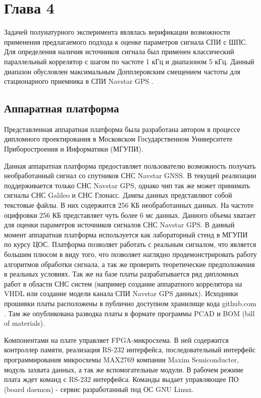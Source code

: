\section{Глава 4}
\label{ss:hw}

Задачей полунатурного эксперимента являлась верификации возможности применения предлагаемого подхода к оценке параметров сигнала СПИ с ШПС. Для определения наличия источников
сигнала был применен классический параллельный коррелятор \cite{tsui} с шагом по частоте 1 кГц и диапазоном 5 кГц. Данный диапазон обусловлен максимальным Допплеровским
смещением частоты для стационарного приемника в СПИ Navstar GPS \cite{shahtarin_sync, tsui}. 

\subsection{Аппаратная платформа}
Представленная аппаратная платформа была разработана автором в процессе дипломного проектирования в Московском Государственном Университете Приборостроения и Информатики (МГУПИ).

Данная аппаратная платформа предоставляет пользователю возможность получать необработанный сигнал со спутников СНС Navstar GNSS. В текущей реализации поддерживается только 
СНС Navstar GPS, однако чип так же может принимать сигналы СНС Galileo и СНС Глонасс. Дампы данных представляют собой текстовые файлы. В них содержится 256 КБ необработанных данных.
На частоте оцифровки 256 КБ представляет чуть более 6 мс данных. Данного объема хватает для оценки параметров источников сигналов СНС Navstar GPS.
В данный момент аппаратная платформа используется как лабораторный стенд в МГУПИ по курсу ЦОС. Платформа позволяет работать с реальным сигналом, что является большим плюсом в
виду того, что позволяет наглядно продемонстрировать работу алгоритмов обработки сигнала, а так же проверить теоретические предположения в реальных условиях.
Так же на базе платы разрабатывается ряд дипломных работ в области СНС систем (например создание аппаратного коррелятора на VHDL или создание модели канала 
СПИ Navstar GPS данных). Исходники прошивки платы расположены в публично доступном хранилище кода github.com \cite{github-gpsproject}.
Там же опубликована разводка платы в формате программы PCAD и BOM (bill of materials).

Компонентами на плате управляет FPGA-микросхема. В ней содержится контроллер памяти, реализация RS-232 интерфейса, последовательный интерфейс программирования микросхемы
MAX2769 компании Maxim Semiconducter, модуль захвата данных, а так же вспомогательные модули. В рабочем режиме плата ждет команд с RS-232 интерфейса.
Команды выдает управляющее ПО (board daemon) - сервис разработанный под ОС GNU Linux.

